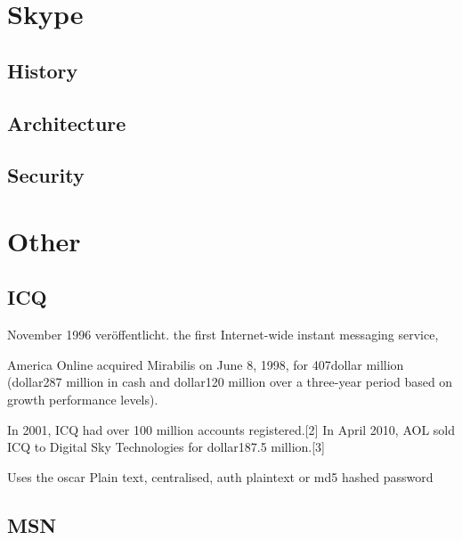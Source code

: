 \section{Skype}
\subsection{History}
\subsection{Architecture}
\subsection{Security}

\section{Other}
\subsection{ICQ}
November 1996 veröffentlicht.
 the first Internet-wide instant messaging service, 

America Online acquired Mirabilis on June 8, 1998, for 407dollar million (dollar287 million in cash and dollar120 million over a three-year period based on growth performance levels).

In 2001, ICQ had over 100 million accounts registered.[2] In April 2010, AOL sold ICQ to Digital Sky Technologies for dollar187.5 million.[3]

Uses the oscar \cite{oscar}
Plain text, centralised, auth plaintext or md5 hashed password

\subsection{MSN}

